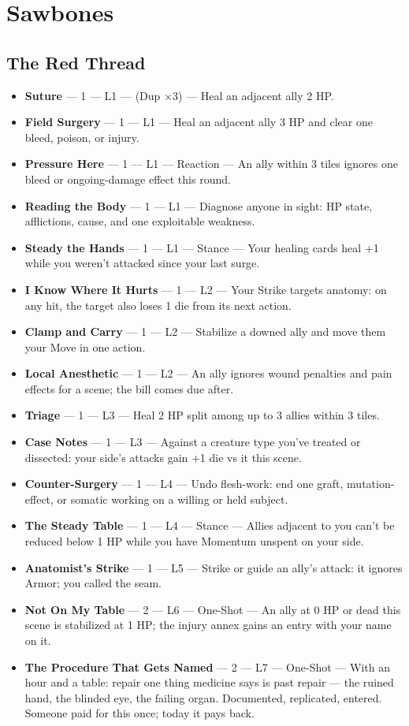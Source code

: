 \section{Sawbones}

\subsection{The Red Thread}
\begin{itemize}
    \item \textbf{Suture} --- 1 --- L1 --- (Dup ×3) --- Heal an adjacent ally 2 HP.
    \item \textbf{Field Surgery} --- 1 --- L1 --- Heal an adjacent ally 3 HP and clear one bleed, poison, or injury.
    \item \textbf{Pressure Here} --- 1 --- L1 --- Reaction --- An ally within 3 tiles ignores one bleed or ongoing-damage effect this round.
    \item \textbf{Reading the Body} --- 1 --- L1 --- Diagnose anyone in sight: HP state, afflictions, cause, and one exploitable weakness.
    \item \textbf{Steady the Hands} --- 1 --- L1 --- Stance --- Your healing cards heal +1 while you weren't attacked since your last surge.
    \item \textbf{I Know Where It Hurts} --- 1 --- L2 --- Your Strike targets anatomy: on any hit, the target also loses 1 die from its next action.
    \item \textbf{Clamp and Carry} --- 1 --- L2 --- Stabilize a downed ally and move them your Move in one action.
    \item \textbf{Local Anesthetic} --- 1 --- L2 --- An ally ignores wound penalties and pain effects for a scene; the bill comes due after.
    \item \textbf{Triage} --- 1 --- L3 --- Heal 2 HP split among up to 3 allies within 3 tiles.
    \item \textbf{Case Notes} --- 1 --- L3 --- Against a creature type you've treated or dissected: your side's attacks gain +1 die vs it this scene.
    \item \textbf{Counter-Surgery} --- 1 --- L4 --- Undo flesh-work: end one graft, mutation-effect, or somatic working on a willing or held subject.
    \item \textbf{The Steady Table} --- 1 --- L4 --- Stance --- Allies adjacent to you can't be reduced below 1 HP while you have Momentum unspent on your side.
    \item \textbf{Anatomist's Strike} --- 1 --- L5 --- Strike or guide an ally's attack: it ignores Armor; you called the seam.
    \item \textbf{Not On My Table} --- 2 --- L6 --- One-Shot --- An ally at 0 HP or dead this scene is stabilized at 1 HP; the injury annex gains an entry with your name on it.
    \item \textbf{The Procedure That Gets Named} --- 2 --- L7 --- One-Shot --- With an hour and a table: repair one thing medicine says is past repair --- the ruined hand, the blinded eye, the failing organ. Documented, replicated, entered. Someone paid for this once; today it pays back.
\end{itemize}

